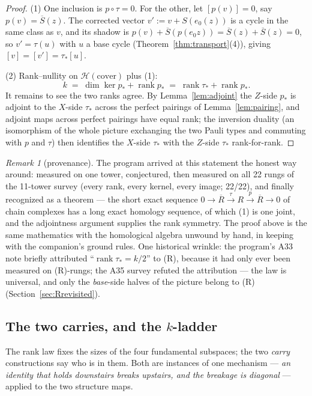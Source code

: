 \documentclass[11pt]{article}
\theoremstyle{plain}
\theoremstyle{definition}
\theoremstyle{remark}
\newtheorem{remark}[theorem]{Remark}
\newcommand{\clH}{\mathcal{H}}
\newcommand{\cov}{\mathrm{cover}}
\newcommand{\Rbase}{\overline{R}}
\newcommand{\Rcov}{R}
\newcommand{\ov}[1]{\overline{#1}}
\begin{document}
\begin{proof}
(1) One inclusion is $p \circ \tau = 0$. For the other, let $[p(v)] = 0$,
say $p(v) = \ov S(z)$. The corrected vector $v' := v + S(e_0(z))$ is a
cycle in the same class as $v$, and its shadow is $p(v) + \ov S(p(e_0 z))
= \ov S(z) + \ov S(z) = 0$, so $v' = \tau(u)$ with $u$ a base cycle
(Theorem~\ref{thm:transport}(4)), giving $[v] = [v'] = \tau_*[u]$.

(2) Rank--nullity on $\clH(\cov)$ plus (1):
\[
k \;=\; \dim \ker p_* + \operatorname{rank} p_*
\;=\; \operatorname{rank} \tau_* + \operatorname{rank} p_* .
\]
It remains to see the two ranks agree. By Lemma~\ref{lem:adjoint} the
$Z$-side $p_*$ is adjoint to the $X$-side $\tau_*$ across the perfect
pairings of Lemma~\ref{lem:pairing}, and adjoint maps across perfect
pairings have equal rank; the inversion duality (an isomorphism of the
whole picture exchanging the two Pauli types and commuting with $p$ and
$\tau$) then identifies the $X$-side $\tau_*$ with the $Z$-side $\tau_*$
rank-for-rank.
\end{proof}

\begin{remark}[provenance]
The program arrived at this statement the honest way around: measured on
one tower, conjectured, then measured on all 22 rungs of the 11-tower
survey (every rank, every kernel, every image; 22/22), and finally
recognized as a theorem --- the short exact sequence $0 \to \Rbase
\xrightarrow{\tau} \Rcov \xrightarrow{p} \Rbase \to 0$ of chain complexes
has a long exact homology sequence, of which (1) is one joint, and the
adjointness argument supplies the rank symmetry. The proof above is the
same mathematics with the homological algebra unwound by hand, in keeping
with the companion's ground rules. One historical wrinkle: the program's
A33 note briefly attributed ``$\operatorname{rank} \tau_* = k/2$'' to
(R), because it had only ever been measured on (R)-rungs; the A35 survey
refuted the attribution --- the law is universal, and only the
\emph{base}-side halves of the picture belong to (R)
(Section~\ref{sec:Rrevisited}).
\end{remark}

\subsection{The two carries, and the \texorpdfstring{$k$}{k}-ladder}
\label{sec:twocarries}

The rank law fixes the sizes of the four fundamental subspaces; the two
\emph{carry} constructions say who is in them. Both are instances of one
mechanism --- \emph{an identity that holds downstairs breaks upstairs,
and the breakage is diagonal} --- applied to the two structure maps.
\end{document}
